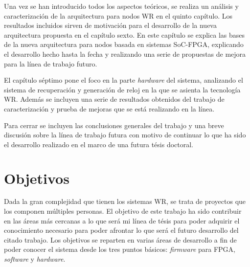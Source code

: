 Una vez se han introducido todos los aspectos teóricos, se realiza un análisis 
y caracterización de la arquitectura para nodos WR en el quinto capítulo. Los 
resultados incluidos sirven de motivación para el desarrollo de la nueva 
arquitectura propuesta en el capítulo sexto. En este capítulo se explica las 
bases de la nueva arquitectura para nodos basada en sistemas SoC-FPGA, 
explicando el desarrollo hecho hasta la fecha y realizando una serie de 
propuestas de mejora para la línea de trabajo futuro.

El capítulo séptimo pone el foco en la parte \textit{hardware} del sistema, 
analizando el sistema de recuperación y generación de reloj en la que se 
asienta la tecnología WR. Además se incluyen una serie de resultados obtenidos 
del trabajo de caracterización y prueba de mejoras que se está realizando en la 
línea.

Para cerrar se incluyen las conclusiones generales del trabajo y una breve 
discusión sobre la línea de trabajo futura con motivo de continuar lo que ha 
sido el desarrollo realizado en el marco de una futura tésis doctoral.

\section{Objetivos}

Dada la gran complejidad que tienen los sistemas WR, se trata de proyectos que 
los componen múltiples personas. El objetivo de este trabajo ha sido contribuir 
en las áreas más cercanas a lo que será mi línea de tésis para poder adquirir 
el conocimiento necesario para poder afrontar lo que será el futuro desarrollo 
del citado trabajo. Los objetivos se reparten en varias áreas de desarrollo a 
fin de poder conocer el sistema desde los tres puntos básicos: 
\textit{firmware} para FPGA, \textit{software} y \textit{hardware}.


